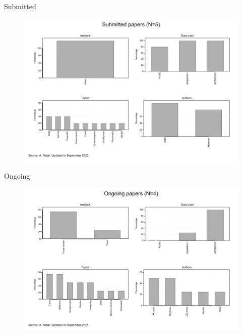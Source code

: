 \documentclass[aspectratio=169]{beamer}
\begin{document}
\begin{frame}{Submitted}

\begin{figure}[h]
\centering
\includegraphics[width=0.7\columnwidth]{INPUT/SU_global}
\end{figure}

\end{frame}





\begin{frame}{Ongoing}

\begin{figure}[h]
\centering
\includegraphics[width=0.7\columnwidth]{INPUT/OG_global}
\end{figure}

\end{frame}
\end{document}
